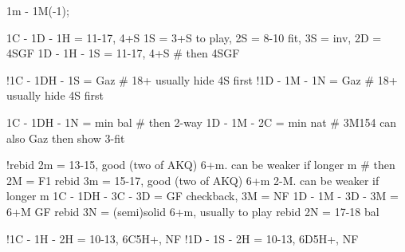 1m - 1M(-1); 

1C - 1D - 1H = 11-17, 4+S  
    1S = 3+S to play, 2S = 8-10 fit, 3S = inv, 2D = 4SGF
1D - 1H - 1S = 11-17, 4+S  # then 4SGF

!1C - 1DH - 1S = Gaz        # 18+ usually hide 4S first
!1D - 1M - 1N = Gaz         # 18+ usually hide 4S first

1C - 1DH - 1N = min bal    # then 2-way
1D - 1M - 2C = min nat     # 3M154 can also Gaz then show 3-fit

!rebid 2m = 13-15, good (two of AKQ) 6+m. can be weaker if longer m  # then 2M = F1
rebid 3m = 15-17, good (two of AKQ) 6+m 2-M. can be weaker if longer m
    1C - 1DH - 3C - 3D = GF checkback, 3M = NF
    1D - 1M - 3D - 3M = 6+M GF
rebid 3N = (semi)solid 6+m, usually to play
rebid 2N = 17-18 bal

!1C - 1H - 2H = 10-13, 6C5H+, NF
!1D - 1S - 2H = 10-13, 6D5H+, NF